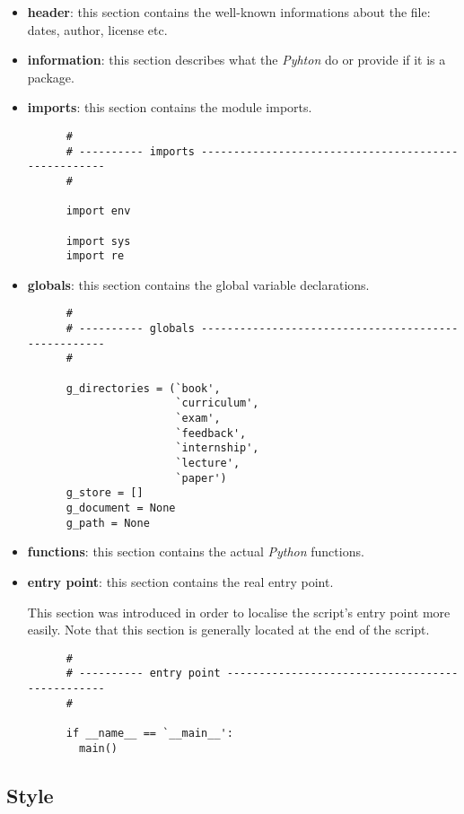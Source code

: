 \begin{itemize}
  \item
    \textbf{header}: this section contains the well-known informations about
    the file: dates, author, license etc.
  \item
    \textbf{information}: this section describes what the \textit{Pyhton}
    do or provide if it is a package.
  \item
    \textbf{imports}: this section contains the module imports.

    \begin{verbatim}
      #
      # ---------- imports ----------------------------------------------------
      #

      import env

      import sys
      import re
    \end{verbatim}
  \item
    \textbf{globals}: this section contains the global variable declarations.

    \begin{verbatim}
      #
      # ---------- globals ----------------------------------------------------
      #

      g_directories = (`book',
                       `curriculum',
                       `exam',
                       `feedback',
                       `internship',
                       `lecture',
                       `paper')
      g_store = []
      g_document = None
      g_path = None
    \end{verbatim}
  \item
    \textbf{functions}: this section contains the actual \textit{Python}
    functions.
  \item
    \textbf{entry point}: this section contains the real entry point.

    This section was introduced in order to localise the script's entry
    point more easily. Note that this section is generally located at
    the end of the script.

    \begin{verbatim}
      #
      # ---------- entry point ------------------------------------------------
      #

      if __name__ == `__main__':
        main()
    \end{verbatim}
\end{itemize}

%
%

\subsection{Style}

